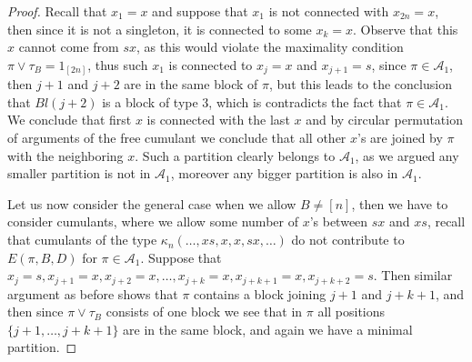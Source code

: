 \documentclass{amsart}
\newcommand{\cA}{\mathcal{A}}
\begin{document}
\begin{proof}
    Recall that $x_1=x$ and suppose that $x_1$ is not connected with $x_{2n}=x$, then since it is not a singleton, it is connected to some $x_k=x$. Observe that this $x$ cannot come from $sx$, as this would violate the maximality condition $\pi\vee\tau_B=1_{[2n]}$, thus such $x_1$ is connected to $x_j=x$ and $x_{j+1}=s$, since $\pi\in \cA_1$, then $j+1$ and $j+2$ are in the same block of $\pi$, but this leads to the conclusion that $Bl(j+2)$ is a block of type 3, which is contradicts the fact that $\pi\in \cA_1$. We conclude that first $x$ is connected with the last $x$ and by circular permutation of arguments of the free cumulant we conclude that all other $x$'s are joined by $\pi$ with the neighboring $x$. Such a partition clearly belongs to $\cA_1$, as we argued any smaller partition is not in $\cA_1$, moreover any bigger partition is also in $\cA_1$.
    
    Let us now consider the general case when we allow $B\neq [n]$, then we have to consider cumulants, where we allow some number of $x$'s between $sx$ and $xs$, recall that cumulants of the type $\kappa_n(\ldots,xs,x,x,sx,\ldots)$ do not contribute to $E(\pi,B,D)$ for $\pi\in \cA_1$. Suppose that $x_j=s, x_{j+1}=x,x_{j+2}=x,\ldots,x_{j+k}=x,x_{j+k+1}=x,x_{j+k+2}=s$. Then similar argument as before shows that $\pi$ contains a block joining $j+1$ and $j+k+1$, and then since  $\pi\vee \tau_B$ consists of one block we see that in $\pi$ all positions $\{j+1,\ldots,j+k+1\}$ are in the same block, and again we have a minimal partition.    
	

\end{proof}
\end{document}

